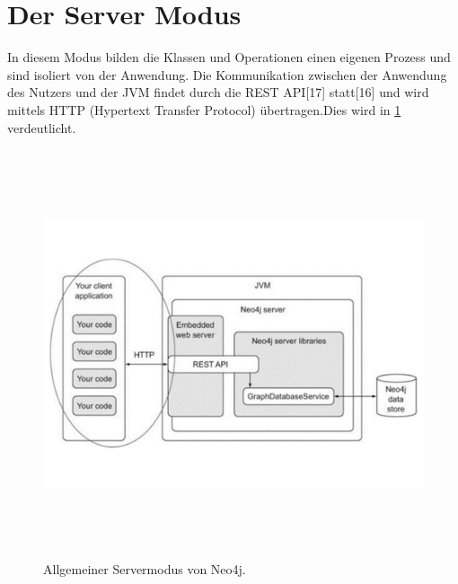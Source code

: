 \section{Der Server Modus}

In diesem Modus bilden die Klassen und Operationen einen eigenen Prozess und sind isoliert von der Anwendung. Die Kommunikation zwischen der Anwendung des Nutzers und der JVM findet durch die REST API[17] statt[16] und wird mittels HTTP (Hypertext Transfer Protocol) übertragen.Dies wird in \ref{fig:Embedded} verdeutlicht.
\begin{figure}[th]
	\centering
	\includegraphics [width=14cm, height=12cm]{Figures/Server}
	\caption[Server]{Allgemeiner Servermodus von Neo4j.}
	\label{fig:Embedded}
\end{figure}